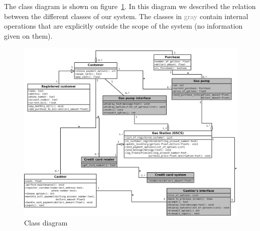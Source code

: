 The class diagram is shown on figure~\ref{fig:class-diagram}. In this
diagram we described the relation between the different classes of our
system. The classes in \textcolor{gray}{gray} contain internal operations
that are explicitly outside the scope of the system (no information given
on them).

\begin{landscape}
\begin{figure}[!ht]
\includegraphics[width=\linewidth]{drafts/class_diagram.png}
\caption{Class diagram}
\label{fig:class-diagram}
\end{figure}
\end{landscape}
